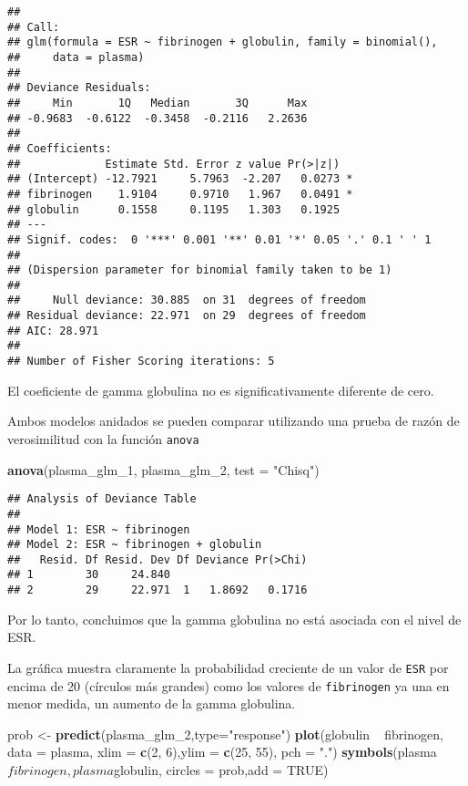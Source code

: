 \documentclass[]{article}
\newenvironment{Shaded}{\begin{snugshade}}{\end{snugshade}}
\newcommand{\KeywordTok}[1]{\textcolor[rgb]{0.13,0.29,0.53}{\textbf{{#1}}}}
\newcommand{\DataTypeTok}[1]{\textcolor[rgb]{0.13,0.29,0.53}{{#1}}}
\newcommand{\DecValTok}[1]{\textcolor[rgb]{0.00,0.00,0.81}{{#1}}}
\newcommand{\StringTok}[1]{\textcolor[rgb]{0.31,0.60,0.02}{{#1}}}
\newcommand{\OtherTok}[1]{\textcolor[rgb]{0.56,0.35,0.01}{{#1}}}
\newcommand{\NormalTok}[1]{{#1}}
\numberwithin{equation}{section}
\begin{document}
\begin{verbatim}
## 
## Call:
## glm(formula = ESR ~ fibrinogen + globulin, family = binomial(), 
##     data = plasma)
## 
## Deviance Residuals: 
##     Min       1Q   Median       3Q      Max  
## -0.9683  -0.6122  -0.3458  -0.2116   2.2636  
## 
## Coefficients:
##             Estimate Std. Error z value Pr(>|z|)  
## (Intercept) -12.7921     5.7963  -2.207   0.0273 *
## fibrinogen    1.9104     0.9710   1.967   0.0491 *
## globulin      0.1558     0.1195   1.303   0.1925  
## ---
## Signif. codes:  0 '***' 0.001 '**' 0.01 '*' 0.05 '.' 0.1 ' ' 1
## 
## (Dispersion parameter for binomial family taken to be 1)
## 
##     Null deviance: 30.885  on 31  degrees of freedom
## Residual deviance: 22.971  on 29  degrees of freedom
## AIC: 28.971
## 
## Number of Fisher Scoring iterations: 5
\end{verbatim}

El coeficiente de gamma globulina no es significativamente diferente de
cero.

Ambos modelos anidados se pueden comparar utilizando una prueba de razón
de verosimilitud con la función \texttt{anova}

\begin{Shaded}
\begin{Highlighting}[]
\KeywordTok{anova}\NormalTok{(plasma_glm_1, plasma_glm_2, }\DataTypeTok{test =} \StringTok{"Chisq"}\NormalTok{)}
\end{Highlighting}
\end{Shaded}

\begin{verbatim}
## Analysis of Deviance Table
## 
## Model 1: ESR ~ fibrinogen
## Model 2: ESR ~ fibrinogen + globulin
##   Resid. Df Resid. Dev Df Deviance Pr(>Chi)
## 1        30     24.840                     
## 2        29     22.971  1   1.8692   0.1716
\end{verbatim}

Por lo tanto, concluimos que la gamma globulina no está asociada con el
nivel de ESR.

La gráfica muestra claramente la probabilidad creciente de un valor de
\texttt{ESR} por encima de 20 (círculos más grandes) como los valores de
\texttt{fibrinogen} ya una en menor medida, un aumento de la gamma
globulina.

\begin{Shaded}
\begin{Highlighting}[]
\NormalTok{prob <-}\StringTok{ }\KeywordTok{predict}\NormalTok{(plasma_glm_2,}\DataTypeTok{type=}\StringTok{"response"}\NormalTok{)}
\KeywordTok{plot}\NormalTok{(globulin ~}\StringTok{ }\NormalTok{fibrinogen, }\DataTypeTok{data =} \NormalTok{plasma, }\DataTypeTok{xlim =} \KeywordTok{c}\NormalTok{(}\DecValTok{2}\NormalTok{, }\DecValTok{6}\NormalTok{),}\DataTypeTok{ylim =} \KeywordTok{c}\NormalTok{(}\DecValTok{25}\NormalTok{, }\DecValTok{55}\NormalTok{), }\DataTypeTok{pch =} \StringTok{"."}\NormalTok{)}
\KeywordTok{symbols}\NormalTok{(plasma$fibrinogen, plasma$globulin, }\DataTypeTok{circles =} \NormalTok{prob,}\DataTypeTok{add =} \OtherTok{TRUE}\NormalTok{)}
\end{Highlighting}
\end{Shaded}
\end{document}
